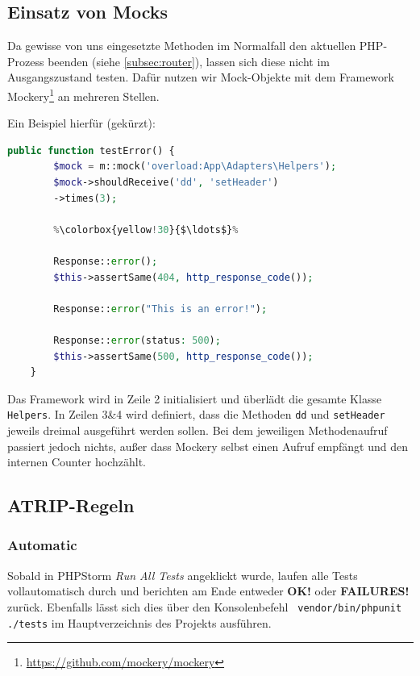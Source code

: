 \documentclass[12pt,a4paper,titlepage,ngerman,pdftex]{report}
\begin{document}
    \subsection{Einsatz von Mocks}
    Da gewisse von uns eingesetzte Methoden im Normalfall den aktuellen PHP-Prozess beenden (siehe \ref{subsec:router}), lassen sich diese nicht im Ausgangszustand testen.
    Dafür nutzen wir Mock-Objekte mit dem Framework Mockery\footnote{\url{https://github.com/mockery/mockery}} an mehreren Stellen.

    Ein Beispiel hierfür (gekürzt):
    \begin{lstlisting}[language=php,label={lst:mockery},escapechar=\%,caption={Einsatz von Mockery}]
    public function testError() {
        $mock = m::mock('overload:App\Adapters\Helpers');
        $mock->shouldReceive('dd', 'setHeader')
        ->times(3);

        %\colorbox{yellow!30}{$\ldots$}%

        Response::error();
        $this->assertSame(404, http_response_code());

        Response::error("This is an error!");

        Response::error(status: 500);
        $this->assertSame(500, http_response_code());
    }\end{lstlisting}

    Das Framework wird in Zeile 2 initialisiert und überlädt die gesamte Klasse \verb|Helpers|.
    In Zeilen 3\&4 wird definiert, dass die Methoden \verb|dd| und \verb|setHeader| jeweils dreimal ausgeführt werden sollen.
    Bei dem jeweiligen Methodenaufruf passiert jedoch nichts, außer dass Mockery selbst einen Aufruf empfängt und den internen Counter hochzählt.

    \subsection{ATRIP-Regeln}
    \label{subsec:atrip-regeln}

    \subsubsection{Automatic}
    Sobald in PHPStorm \textit{Run All Tests} angeklickt wurde, laufen alle Tests vollautomatisch durch und berichten am Ende entweder \textbf{OK!} oder \textbf{FAILURES!} zurück.
    Ebenfalls lässt sich dies über den Konsolenbefehl \verb| vendor/bin/phpunit ./tests| im Hauptverzeichnis des Projekts ausführen.
\end{document}
